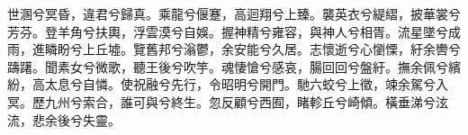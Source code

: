 
\begin{pinyinscope}
世溷兮冥昏，違君兮歸真。乘龍兮偃蹇，高迴翔兮上臻。襲英衣兮緹䌌，披華裳兮芳芬。登羊角兮扶輿，浮雲漠兮自娛。握神精兮雍容，與神人兮相胥。流星墜兮成雨，進瞵盼兮上丘墟。覽舊邦兮滃鬱，余安能兮久居。志懷逝兮心懰慄，紆余轡兮躊躇。聞素女兮微歌，聽王後兮吹竽。魂悽愴兮感哀，腸回回兮盤紆。撫余佩兮繽紛，高太息兮自憐。使祝融兮先行，令昭明兮開門。馳六蛟兮上徵，竦余駕兮入冥。歷九州兮索合，誰可與兮終生。忽反顧兮西囿，睹軫丘兮崎傾。橫垂涕兮泫流，悲余後兮失靈。


\end{pinyinscope}